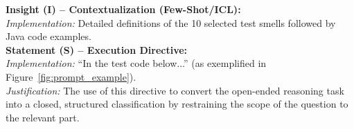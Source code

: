 \documentclass[sigconf]{acmart}
\begin{document}
    \textbf{Insight (I) -- Contextualization (Few-Shot/ICL):} \\
    \textit{Implementation:} Detailed definitions of the 10 selected test smells followed by Java code examples. \\
    

   \textbf{Statement (S) -- Execution Directive:} \\
    \textit{Implementation:} ``In the test code below...'' (as exemplified in Figure~\ref{fig:prompt_example}). \\
    \textit{Justification:} The use of this directive to convert the open-ended reasoning task into a closed, structured classification by restraining the scope of the question to the relevant part.
    
\end{document}
